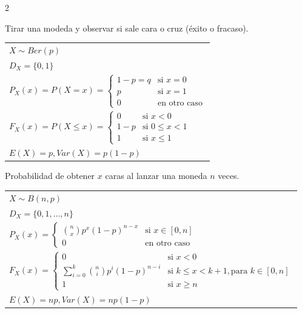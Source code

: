 \documentclass[10pt,a4paper]{article}
\begin{document}
\begin{multicols}{2}
    \begin{tcolorbox}[title=Bernoulli, equal height group=DN1]
        Tirar una modeda y observar si sale cara o cruz (éxito o fracaso).
        \begin{tabular}{l}
            $X \sim Ber(p)$ \\
            $D_X = \{0,1\}$ \\
            $P_X(x) = P(X = x) = \begin{cases} 1-p=q & \text{si } x = 0 \\ p & \text{si } x = 1 \\ 0 & \text{en otro caso} \end{cases}$ \\
            $F_X(x) = P(X \leq x) = \begin{cases} 0 & \text{si } x < 0 \\ 1-p & \text{si } 0 \leq x < 1 \\ 1 & \text{si } x \leq 1\end{cases}$ \\
            $E(X) = p, Var(X) = p(1-p)$
        \end{tabular}
    \end{tcolorbox}
    \begin{tcolorbox}[title=Binomial, equal height group=DN1]
        Probabilidad de obtener $x$ caras al lanzar una moneda $n$ veces.
        \begin{tabular}{l}
            $X \sim B(n, p)$ \\
            $D_X = \{0,1,\ldots,n\}$ \\
            $P_X(x) = \begin{cases} \binom{n}{x}p^x(1-p)^{n-x} & \text{si } x \in [0, n] \\ 0 & \text{en otro caso} \end{cases}$ \\
            $F_X(x) = \begin{cases} 0 & \text{si } x < 0 \\ \sum\limits_{i=0}^{k}\binom{n}{i}p^i(1-p)^{n-i} & \text{si } k \leq x < k+1, \text{para } k \in [0, n] \\ 1 & \text{si } x \geq n \end{cases}$ \\
            $E(X) = np, Var(X) = np(1-p)$
        \end{tabular}
    \end{tcolorbox}
\end{multicols}
\end{document}
